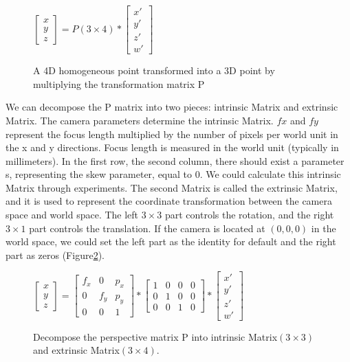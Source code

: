 \documentclass{article}
\begin{document}
\begin{figure}[h!]
\centering
    $\begin{bmatrix}x
\\ y
\\ z

\end{bmatrix} = P(3\times4)*\begin{bmatrix}x'
\\ y'
\\ z'
\\ w'

\end{bmatrix}$

\caption{A 4D homogeneous point transformed into a 3D point by multiplying the transformation matrix P}
\label{matrix1}
\end{figure}

We can decompose the P matrix into two pieces: intrinsic Matrix and extrinsic Matrix. The camera parameters determine the intrinsic Matrix. $fx$ and $fy$ represent the focus length multiplied by the number of pixels per world unit in the x and y directions. Focus length is measured in the world unit (typically in millimeters). In the first row, the second column, there should exist a parameter s, representing the skew parameter, equal to 0. We could calculate this intrinsic Matrix through experiments. The second Matrix is called the extrinsic Matrix, and it is used to represent the coordinate transformation between the camera space and world space. The left $3\times3$ part controls the rotation, and the right $3\times1$ part controls the translation. If the camera is located at $(0,0,0)$ in the world space, we could set the left part as the identity for default and the right part as zeros (Figure\ref{P3*4}). \newline
\begin{figure}[h!]
\centering
$
\begin{bmatrix}x
\\ y
\\ z

\end{bmatrix} =\begin{bmatrix}f_{x}
 & 0 &p_{x} \\0 
 &  f_{y}& p_{y}\\0 
 &  0&1 
\end{bmatrix} *\begin{bmatrix}1
 & 0 & 0 & 0\\ 0
 & 1 &  0& 0\\ 0
 & 0 &  1& 0
\end{bmatrix} *\begin{bmatrix}x'
\\ y'
\\ z'
\\ w'

\end{bmatrix}$
\caption{Decompose the perspective matrix P into intrinsic Matrix$(3\times3)$ and extrinsic Matrix$(3\times4)$.}
\label{P3*4}
\end{figure}
\end{document}
